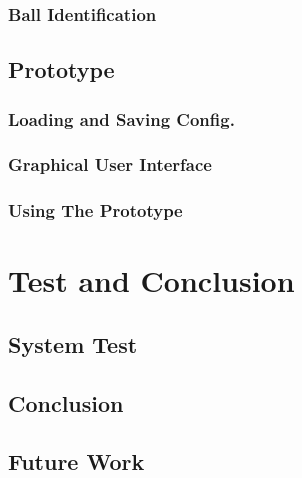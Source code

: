 			\section{Ball Identification}
				\label{sec:balls-id}
				
				
	\chapter{Prototype}
		
		
		\section{Loading and Saving Config.}
			\label{sec:loadsaveconfig}
					
		
		\section{Graphical User Interface}
			\label{sec:gui}	
			
			
		\section{Using The Prototype}
			\label{sec:using prototype}
			

\part{Test and Conclusion}		
\chapter{System Test}
	\label{sec:system-test}
	
	
\chapter{Conclusion}
	\label{sec:conclusion}
	
	
\chapter{Future Work}
	\label{sec:futurework}
	



\listoffixmes


